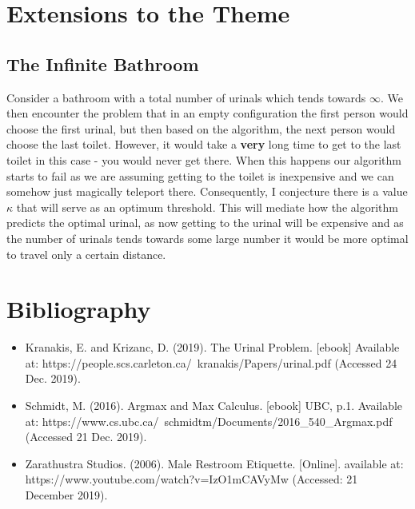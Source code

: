\documentclass{article}
\begin{document}
\section{Extensions to the Theme}
\subsection{The Infinite Bathroom}
Consider a bathroom with a total number of urinals which tends towards $\infty$. We then encounter the problem that in an empty configuration the first person would choose the first urinal, but then based on the algorithm, the next person would choose the last toilet. However, it would take a \textbf{very} long time to get to the last toilet in this case - you would never get there. When this happens our algorithm starts to fail as we are assuming getting to the toilet is inexpensive and we can somehow just magically teleport there. Consequently, I conjecture there is a value $\kappa$ that will serve as an optimum threshold. This will mediate how the algorithm predicts the optimal urinal, as now getting to the urinal will be expensive and as the number of urinals tends towards some large number it would be more optimal to travel only a certain distance.
\section{Bibliography}
\begin{itemize}
  \item Kranakis, E. and Krizanc, D. (2019). The Urinal Problem. [ebook] Available at: https://people.scs.carleton.ca/~kranakis/Papers/urinal.pdf (Accessed 24 Dec. 2019).
  \item Schmidt, M. (2016). Argmax and Max Calculus. [ebook] UBC, p.1. Available at: https://www.cs.ubc.ca/~schmidtm/Documents/2016\_540\_Argmax.pdf (Accessed 21 Dec. 2019).
  \item Zarathustra Studios. (2006). Male Restroom Etiquette. [Online]. available at: https://www.youtube.com/watch?v=IzO1mCAVyMw (Accessed: 21 December 2019).
\end{itemize}
\end{document}
